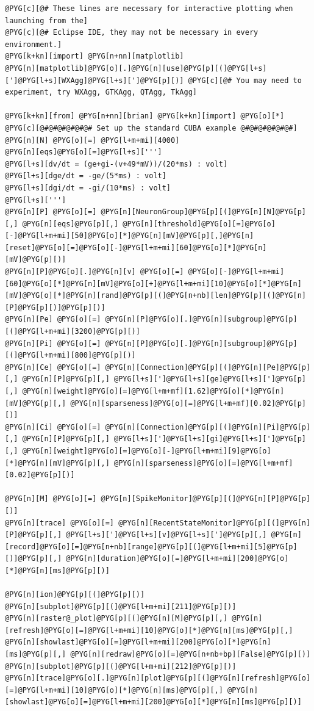 \documentclass[letterpaper,10pt,english]{manual}
\begin{document}
\begin{Verbatim}[commandchars=@\[\]]
@PYG[c][@# These lines are necessary for interactive plotting when launching from the]
@PYG[c][@# Eclipse IDE, they may not be necessary in every environment.]
@PYG[k+kn][import] @PYG[n+nn][matplotlib]
@PYG[n][matplotlib]@PYG[o][.]@PYG[n][use]@PYG[p][(]@PYG[l+s][']@PYG[l+s][WXAgg]@PYG[l+s][']@PYG[p][)] @PYG[c][@# You may need to experiment, try WXAgg, GTKAgg, QTAgg, TkAgg]

@PYG[k+kn][from] @PYG[n+nn][brian] @PYG[k+kn][import] @PYG[o][*]
@PYG[c][@#@#@#@#@#@# Set up the standard CUBA example @#@#@#@#@#@#]
@PYG[n][N] @PYG[o][=] @PYG[l+m+mi][4000]
@PYG[n][eqs]@PYG[o][=]@PYG[l+s][''']
@PYG[l+s][dv/dt = (ge+gi-(v+49*mV))/(20*ms) : volt]
@PYG[l+s][dge/dt = -ge/(5*ms) : volt]
@PYG[l+s][dgi/dt = -gi/(10*ms) : volt]
@PYG[l+s][''']
@PYG[n][P] @PYG[o][=] @PYG[n][NeuronGroup]@PYG[p][(]@PYG[n][N]@PYG[p][,] @PYG[n][eqs]@PYG[p][,] @PYG[n][threshold]@PYG[o][=]@PYG[o][-]@PYG[l+m+mi][50]@PYG[o][*]@PYG[n][mV]@PYG[p][,]@PYG[n][reset]@PYG[o][=]@PYG[o][-]@PYG[l+m+mi][60]@PYG[o][*]@PYG[n][mV]@PYG[p][)]
@PYG[n][P]@PYG[o][.]@PYG[n][v] @PYG[o][=] @PYG[o][-]@PYG[l+m+mi][60]@PYG[o][*]@PYG[n][mV]@PYG[o][+]@PYG[l+m+mi][10]@PYG[o][*]@PYG[n][mV]@PYG[o][*]@PYG[n][rand]@PYG[p][(]@PYG[n+nb][len]@PYG[p][(]@PYG[n][P]@PYG[p][)]@PYG[p][)]
@PYG[n][Pe] @PYG[o][=] @PYG[n][P]@PYG[o][.]@PYG[n][subgroup]@PYG[p][(]@PYG[l+m+mi][3200]@PYG[p][)]
@PYG[n][Pi] @PYG[o][=] @PYG[n][P]@PYG[o][.]@PYG[n][subgroup]@PYG[p][(]@PYG[l+m+mi][800]@PYG[p][)]
@PYG[n][Ce] @PYG[o][=] @PYG[n][Connection]@PYG[p][(]@PYG[n][Pe]@PYG[p][,] @PYG[n][P]@PYG[p][,] @PYG[l+s][']@PYG[l+s][ge]@PYG[l+s][']@PYG[p][,] @PYG[n][weight]@PYG[o][=]@PYG[l+m+mf][1.62]@PYG[o][*]@PYG[n][mV]@PYG[p][,] @PYG[n][sparseness]@PYG[o][=]@PYG[l+m+mf][0.02]@PYG[p][)]
@PYG[n][Ci] @PYG[o][=] @PYG[n][Connection]@PYG[p][(]@PYG[n][Pi]@PYG[p][,] @PYG[n][P]@PYG[p][,] @PYG[l+s][']@PYG[l+s][gi]@PYG[l+s][']@PYG[p][,] @PYG[n][weight]@PYG[o][=]@PYG[o][-]@PYG[l+m+mi][9]@PYG[o][*]@PYG[n][mV]@PYG[p][,] @PYG[n][sparseness]@PYG[o][=]@PYG[l+m+mf][0.02]@PYG[p][)]

@PYG[n][M] @PYG[o][=] @PYG[n][SpikeMonitor]@PYG[p][(]@PYG[n][P]@PYG[p][)]
@PYG[n][trace] @PYG[o][=] @PYG[n][RecentStateMonitor]@PYG[p][(]@PYG[n][P]@PYG[p][,] @PYG[l+s][']@PYG[l+s][v]@PYG[l+s][']@PYG[p][,] @PYG[n][record]@PYG[o][=]@PYG[n+nb][range]@PYG[p][(]@PYG[l+m+mi][5]@PYG[p][)]@PYG[p][,] @PYG[n][duration]@PYG[o][=]@PYG[l+m+mi][200]@PYG[o][*]@PYG[n][ms]@PYG[p][)]

@PYG[n][ion]@PYG[p][(]@PYG[p][)]
@PYG[n][subplot]@PYG[p][(]@PYG[l+m+mi][211]@PYG[p][)]
@PYG[n][raster@_plot]@PYG[p][(]@PYG[n][M]@PYG[p][,] @PYG[n][refresh]@PYG[o][=]@PYG[l+m+mi][10]@PYG[o][*]@PYG[n][ms]@PYG[p][,] @PYG[n][showlast]@PYG[o][=]@PYG[l+m+mi][200]@PYG[o][*]@PYG[n][ms]@PYG[p][,] @PYG[n][redraw]@PYG[o][=]@PYG[n+nb+bp][False]@PYG[p][)]
@PYG[n][subplot]@PYG[p][(]@PYG[l+m+mi][212]@PYG[p][)]
@PYG[n][trace]@PYG[o][.]@PYG[n][plot]@PYG[p][(]@PYG[n][refresh]@PYG[o][=]@PYG[l+m+mi][10]@PYG[o][*]@PYG[n][ms]@PYG[p][,] @PYG[n][showlast]@PYG[o][=]@PYG[l+m+mi][200]@PYG[o][*]@PYG[n][ms]@PYG[p][)]


\end{Verbatim}
\end{document}
